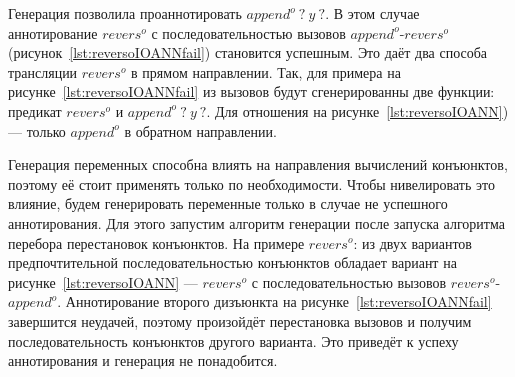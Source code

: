Генерация позволила проаннотировать $append^o \ ? \ y \ ?$. 
В этом случае аннотирование $revers^o$ с последовательностью вызовов $append^o$-$revers^o$ (рисунок~\ref{lst:reversoIOANNfail}) становится успешным.
Это даёт два способа трансляции $revers^o$ в прямом направлении.
Так, для примера на рисунке~\ref{lst:reversoIOANNfail} из вызовов будут сгенерированны две функции: предикат $revers^o$ и $append^o \ ? \ y \ ?$.
Для отношения на рисунке~\ref{lst:reversoIOANN}) --- только $append^o$ в обратном направлении.

Генерация переменных способна влиять на направления вычислений конъюнктов, поэтому её стоит применять только по необходимости.
Чтобы нивелировать это влияние, будем генерировать переменные только в случае не успешного аннотирования.
Для этого запустим алгоритм генерации после запуска алгоритма перебора перестановок конъюнктов.
На примере $revers^o$: из двух вариантов предпочтительной последовательностью конъюнктов обладает вариант на рисунке~\ref{lst:reversoIOANN} --- $revers^o$ с последовательностью вызовов $revers^o$-$append^o$.
Аннотирование второго дизъюнкта на рисунке~\ref{lst:reversoIOANNfail} завершится неудачей, поэтому произойдёт перестановка вызовов и получим последовательность конъюнктов другого варианта.
Это приведёт к успеху аннотирования и генерация не понадобится.
